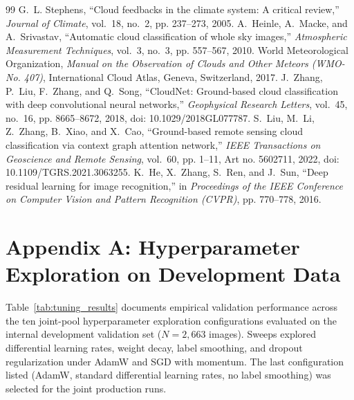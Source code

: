 \documentclass[11pt,a4paper]{article}
\begin{document}

\begin{thebibliography}{99}
\footnotesize
\setlength{\itemsep}{-1pt}
\setlength{\parskip}{0pt}
G.~L. Stephens, ``Cloud feedbacks in the climate system: A critical review,'' \emph{Journal of Climate}, vol.~18, no.~2, pp. 237--273, 2005.
A.~Heinle, A.~Macke, and A.~Srivastav, ``Automatic cloud classification of whole sky images,'' \emph{Atmospheric Measurement Techniques}, vol.~3, no.~3, pp. 557--567, 2010.
World Meteorological Organization, \emph{Manual on the Observation of Clouds and Other Meteors (WMO-No. 407)}, International Cloud Atlas, Geneva, Switzerland, 2017.
J.~Zhang, P.~Liu, F.~Zhang, and Q.~Song, ``CloudNet: Ground-based cloud classification with deep convolutional neural networks,'' \emph{Geophysical Research Letters}, vol.~45, no.~16, pp. 8665--8672, 2018, doi: 10.1029/2018GL077787.
S.~Liu, M.~Li, Z.~Zhang, B.~Xiao, and X.~Cao, ``Ground-based remote sensing cloud classification via context graph attention network,'' \emph{IEEE Transactions on Geoscience and Remote Sensing}, vol.~60, pp. 1--11, Art no. 5602711, 2022, doi: 10.1109/TGRS.2021.3063255.
K.~He, X.~Zhang, S.~Ren, and J.~Sun, ``Deep residual learning for image recognition,'' in \emph{Proceedings of the IEEE Conference on Computer Vision and Pattern Recognition (CVPR)}, pp. 770--778, 2016.
\end{thebibliography}

\clearpage
\appendix
\section*{Appendix A: Hyperparameter Exploration on Development Data}
\label{sec:appendix_tuning}

Table~\ref{tab:tuning_results} documents empirical validation performance across the ten joint-pool hyperparameter exploration configurations evaluated on the internal development validation set ($N=2,663$ images). Sweeps explored differential learning rates, weight decay, label smoothing, and dropout regularization under AdamW and SGD with momentum. The last configuration listed (AdamW, standard differential learning rates, no label smoothing) was selected for the joint production runs.
\end{document}

